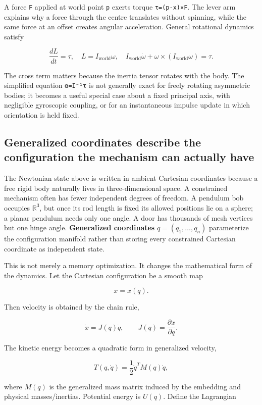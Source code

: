 A force \texttt{F} applied at world point \texttt{p} exerts torque \texttt{τ=(p-x)×F}. The lever arm explains why a force through the centre translates without spinning, while the same force at an offset creates angular acceleration. General rotational dynamics satisfy

\[
\frac{dL}{dt}=\tau,\quad L=I_{\mathrm{world}}\omega,\quad
I_{\mathrm{world}}\dot\omega+\omega\times(I_{\mathrm{world}}\omega)=\tau .
\]

The cross term matters because the inertia tensor rotates with the body. The simplified equation \texttt{α=I⁻¹τ} is not generally exact for freely rotating asymmetric bodies; it becomes a useful special case about a fixed principal axis, with negligible gyroscopic coupling, or for an instantaneous impulse update in which orientation is held fixed.

\subsection{Generalized coordinates describe the configuration the mechanism can actually have}\label{02-foundations-ii-ch039-generalized-coordinates-describe-the-configuration-the-mechanism-can-actually-have}

The Newtonian state above is written in ambient Cartesian coordinates because a free rigid body naturally lives in three-dimensional space. A constrained mechanism often has fewer independent degrees of freedom. A pendulum bob occupies \(\mathbb R^3\), but once its rod length is fixed its allowed positions lie on a sphere; a planar pendulum needs only one angle. A door has thousands of mesh vertices but one hinge angle. \textbf{Generalized coordinates} \(q=(q_1,\ldots,q_n)\) parameterize the configuration manifold rather than storing every constrained Cartesian coordinate as independent state.

This is not merely a memory optimization. It changes the mathematical form of the dynamics. Let the Cartesian configuration be a smooth map

\[
x=x(q).
\]

Then velocity is obtained by the chain rule,

\[
\dot x
=
J(q)\dot q,
\qquad
J(q)=\frac{\partial x}{\partial q}.
\]

The kinetic energy becomes a quadratic form in generalized velocity,

\[
T(q,\dot q)
=
\frac12
\dot q^T M(q)\dot q,
\]

where \(M(q)\) is the generalized mass matrix induced by the embedding and physical masses/inertias. Potential energy is \(U(q)\). Define the Lagrangian

